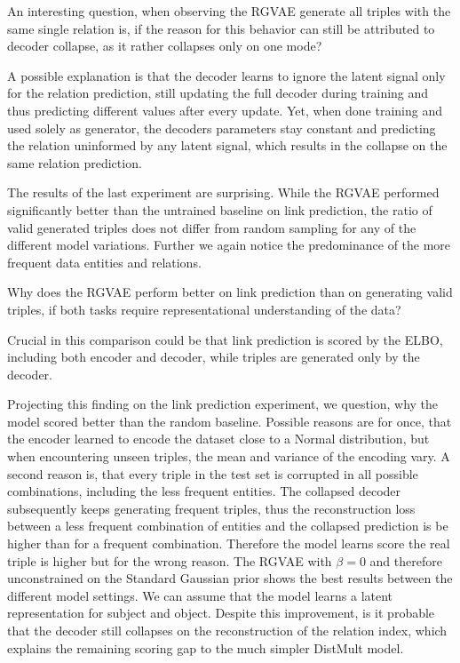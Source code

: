 An interesting question, when observing the RGVAE generate all triples with the same single relation is, if the reason for this behavior can still be attributed to decoder collapse, as it rather collapses only on one mode?

A possible explanation is that the decoder learns to ignore the latent signal only for the relation prediction, still updating the full decoder during training and thus predicting different values after every update. Yet, when done training and used solely as generator, the decoders parameters stay constant and predicting the relation uninformed by any latent signal, which results in the collapse on the same relation prediction.

The results of the last experiment are surprising. While the RGVAE performed significantly better than the untrained baseline on link prediction, the ratio of valid generated triples does not differ from random sampling for any of the different model variations. Further we again notice the predominance of the more frequent data entities and relations.

Why does the RGVAE perform better on link prediction than on generating valid triples, if both tasks require representational understanding of the data?

Crucial in this comparison could be that link prediction is scored by the ELBO, including both encoder and decoder, while triples are generated only by the decoder.


Projecting this finding on the link prediction experiment, we question, why the model scored better than the random baseline. Possible reasons are for once, that the encoder learned to encode the dataset close to a Normal distribution, but when encountering unseen triples, the mean and variance of the encoding vary. A second reason is, that every triple in the test set is corrupted in all possible combinations, including the less frequent entities. The collapsed decoder subsequently keeps generating frequent triples, thus the reconstruction loss between a less frequent combination of entities and the collapsed prediction is be higher than for a frequent combination. Therefore the model learns score the real triple is higher but for the wrong reason. The RGVAE with $\beta = 0$ and therefore unconstrained on the Standard Gaussian prior shows the best results between the different model settings. We can assume that the model learns a latent representation for subject and object. Despite this improvement, is it probable that the decoder still collapses on the reconstruction of the relation index, which explains the remaining scoring gap to the much simpler DistMult model.


